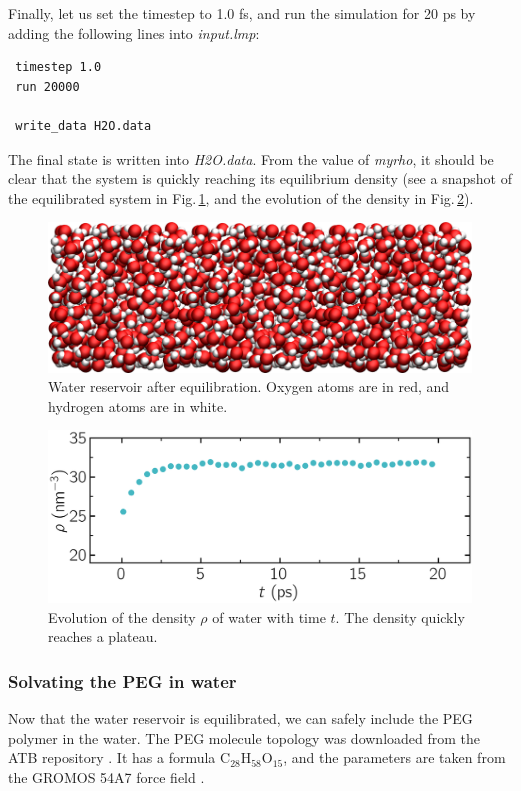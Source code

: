 \documentclass[9pt,tutorial]{livecoms}
\begin{document}
Finally, let us set the timestep to 1.0 fs, and run the simulation for 20 ps by
adding the following lines into \textit{input.lmp}:
{\normalsize \begin{verbatim}
 timestep 1.0
 run 20000

 write_data H2O.data
\end{verbatim}}
The final state is written into \textit{H2O.data}. From the value of \textit{myrho},
it should be clear that the system is quickly reaching its equilibrium
density (see a snapshot of the equilibrated system in Fig.\,\ref{fig:PEG-water},
and the evolution of the density in Fig.\,\ref{fig:PEG-density}).

\begin{figure}
\centering
\includegraphics[width=\linewidth]{PEG-water}
\caption{Water reservoir after equilibration. Oxygen atoms are in red, and hydrogen
atoms are in white.}
\label{fig:PEG-water}
\end{figure}

\begin{figure}
\centering
\includegraphics[width=\linewidth]{PEG-density}
\caption{Evolution of the density $\rho$ of water with time $t$. The density
quickly reaches a plateau.}
\label{fig:PEG-density}
\end{figure}

\subsubsection{Solvating the PEG in water}
Now that the water reservoir is equilibrated, we can safely include the PEG polymer
in the water. The PEG molecule topology was downloaded from the ATB repository
\cite{malde2011automated, oostenbrink2004biomolecular}. It has a formula
$\text{C}_{28}\text{H}_{58}\text{O}_{15}$, and the parameters are taken from
the GROMOS 54A7 force field \cite{schmid2011definition}.
\end{document}
